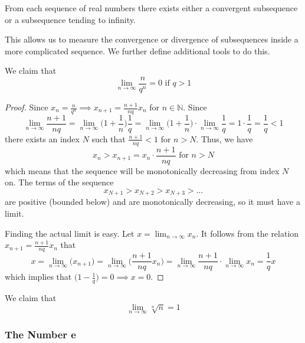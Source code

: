 \documentclass{article}
\begin{document}
      \begin{corollary}
      From each sequence of real numbers there exists either a convergent subsequence or a subsequence tending to infinity. 
      \end{corollary}

      This allows us to measure the convergence or divergence of subsequences inside a more complicated sequence. We further define additional tools to do this. 

      \begin{example}
        We claim that 
        \[\lim_{n\rightarrow \infty} \frac{n}{q^n} = 0 \text{ if } q>1\]
      \end{example}
      \begin{proof}
      Since $x_n = \frac{n}{q^n} \implies x_{n+1} = \frac{n+1}{nq} x_n$ for $n \in \mathbb{N}$. Since 
      \[\lim_{n\rightarrow \infty} \frac{n+1}{nq} = \lim_{n \rightarrow \infty} \bigg(1 + \frac{1}{n}\bigg) \frac{1}{q} = \lim_{n\rightarrow \infty} \bigg( 1 + \frac{1}{n} \bigg) \cdot \lim_{n\rightarrow \infty} \frac{1}{q} = 1 \cdot \frac{1}{q} = \frac{1}{q} < 1\]
      there exists an index $N$ such that $\frac{n+1}{nq} < 1$ for $n>N$. Thus, we have 
      \[x_n > x_{n+1} = x_n \cdot \frac{n+1}{nq} \text{ for } n > N\]
      which means that the sequence will be monotonically decreasing from index $N$ on. The terms of the sequence
      \[x_{N+1} > x_{N+2} > x_{N+3} > \ldots\]
      are positive (bounded below) and are monotonically decreasing, so it must have a limit. 

      Finding the actual limit is easy. Let $x = \lim_{n \rightarrow \infty} x_n$. It follows from the relation $x_{n+1} = \frac{n+1}{nq} x_n$ that
      \[x = \lim_{n\rightarrow \infty} \big(x_{n+1}\big) = \lim_{n \rightarrow \infty} \bigg(\frac{n+1}{nq} x_n \bigg) = \lim_{n \rightarrow \infty} \frac{n+1}{nq} \cdot \lim_{n \rightarrow \infty} x_n = \frac{1}{q} x\]
      which implies that $\big( 1 - \frac{1}{q}\big) = 0 \implies x = 0$.
      \end{proof}

      \begin{example}
        We claim that
        \[\lim_{n\rightarrow \infty} \sqrt[n]{n} = 1\]
      \end{example}

    \subsubsection{The Number e}
\end{document}

